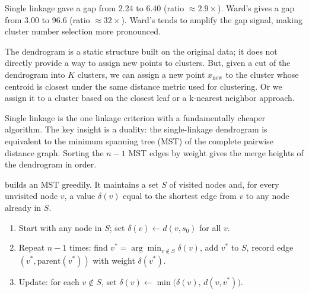  Single linkage gave a gap from 2.24 to 6.40 (ratio ${\approx}2.9\times$). 
Ward's gives a gap from 3.00 to 96.6 (ratio ${\approx}32\times$). Ward's tends to amplify the gap signal, 
making cluster number selection more pronounced. 






\vspace{2.5em}
 The dendrogram 
is a static structure built on the original data; it does not directly provide 
a way to assign new points to clusters. But, given a cut of the dendrogram into $K$ clusters, 
we can assign a new point $x_{\mathrm{new}}$ to the cluster whose centroid is closest 
under the same distance metric used for clustering.
Or we assign it to a cluster based on the closest leaf or a k-nearest neighbor approach.


\iffalse
\vspace{2.5em}

Single linkage is the one linkage criterion with a fundamentally cheaper algorithm.
The key insight is a duality: the single-linkage dendrogram is equivalent to the minimum spanning tree (MST) of the complete pairwise distance graph.
Sorting the $n-1$ MST edges by weight gives the merge heights of the dendrogram in order.

\cite{Prim1957} builds an MST greedily.
It maintains a set $S$ of visited nodes and, for every unvisited node $v$, a value $\delta(v)$ equal to the shortest edge from $v$ to any node already in $S$.

\begin{enumerate}[leftmargin=*, nosep]
    \item Start with any node in $S$; set $\delta(v) \gets d(v, s_0)$ for all $v$.
    \item Repeat $n-1$ times: find $v^* = \arg\min_{v \notin S} \delta(v)$, add $v^*$ to $S$, record edge $(v^*, \mathrm{parent}(v^*))$ with weight $\delta(v^*)$.
    \item Update: for each $v \notin S$, set $\delta(v) \gets \min\bigl(\delta(v),\, d(v, v^*)\bigr)$.
\end{enumerate}


